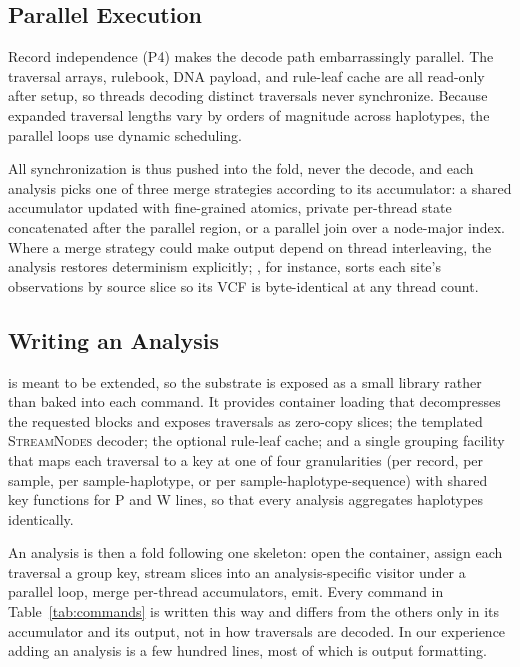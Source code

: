 \subsection{Parallel Execution}
\label{subsec:eng-parallel}

Record independence (P4) makes the decode path embarrassingly parallel. The
traversal arrays, rulebook, DNA payload, and rule-leaf cache are all read-only
after setup, so threads decoding distinct traversals never synchronize. Because
expanded traversal lengths vary by orders of magnitude across haplotypes, the
parallel loops use dynamic scheduling.

All synchronization is thus pushed into the fold, never the decode, and each
analysis picks one of three merge strategies according to its accumulator: a
shared accumulator updated with fine-grained atomics, private per-thread state
concatenated after the parallel region, or a parallel join over a node-major
index. Where a merge strategy could make output depend on thread interleaving, the
analysis restores determinism explicitly; , for instance, sorts
each site's observations by source slice so its VCF is byte-identical at any
thread count.

\subsection{Writing an Analysis}
\label{subsec:eng-api}

\sys is meant to be extended, so the substrate is exposed as a small library
rather than baked into each command. It provides container loading that
decompresses the requested blocks and exposes traversals as zero-copy slices; the
templated \textsc{StreamNodes} decoder; the optional rule-leaf cache; and a single
grouping facility that maps each traversal to a key at one of four granularities
(per record, per sample, per sample-haplotype, or per sample-haplotype-sequence)
with shared key functions for P and W lines, so that every analysis aggregates
haplotypes identically.

An analysis is then a fold following one skeleton: open the container, assign each
traversal a group key, stream slices into an analysis-specific visitor under a
parallel loop, merge per-thread accumulators, emit. Every command in
Table~\ref{tab:commands} is written this way and differs from the others only in
its accumulator and its output, not in how traversals are decoded. In our
experience adding an analysis is a few hundred lines, most of which is output
formatting.

